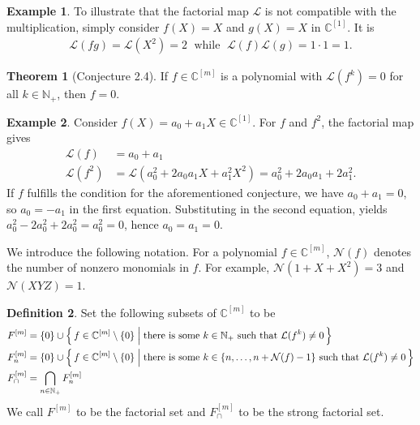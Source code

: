 \documentclass[a4paper]{article}
\theoremstyle{definition}
\newtheorem{definition}{Definition}[]
\newtheorem{example}{Example}[definition]
\newtheorem{theorem}[definition]{Theorem}
\newcommand{\makeset}[2]{\mleft\{\, #1 \; \middle| \; #2 \,\mright\}}
\begin{document}
%
\begin{example}
    To illustrate that the factorial map \(\mathcal{L}\) is not compatible with the multiplication, simply consider \(f(X) = X\) and \(g(X) = X\) in \(\mathbb{C}^{[1]}\). It is
    \begin{align*}
        \mathcal{L}(fg) = \mathcal{L}(X^2) = 2 \;\text{ while } \;\mathcal{L}(f) \mathcal{L}(g) = 1 \cdot 1 = 1 \text{.}
    \end{align*}
\end{example}
%
\begin{theorem}[Conjecture 2.4]
    If \(f \in \mathbb{C}^{[m]}\) is a polynomial with \(\mathcal{L}(f^k) = 0\) for all \(k \in \mathbb{N}_+\), then \(f = 0\).
\end{theorem}
%
\begin{example}
    Consider \(f(X) = a_0 + a_1X \in \mathbb{C}^{[1]}\). For \(f\) and \(f^2\), the factorial map gives
    \begin{align*}
        \mathcal{L}(f) &= a_0 + a_1 \\
        \mathcal{L}(f^2) &= \mathcal{L}(a_0^2 + 2a_0 a_1 X + a_1^2 X^2) = a_0^2 + 2 a_0 a_1 + 2 a_1^2 \text{.}
    \end{align*}    
    If \(f\) fulfills the condition for the aforementioned conjecture, we have \(a_0 + a_1 = 0\), so \(a_0 = -a_1\) in the first equation. Substituting in the second equation, yields \(a_0^2 - 2 a_0^2 + 2a_0^2 = a_0^2 = 0\), hence \(a_0 = a_1 = 0\).
\end{example}
%
We introduce the following notation. For a polynomial \(f \in \mathbb{C}^{[m]}\), \(\mathcal{N}(f)\) denotes the number of nonzero monomials in \(f\). For example, \(\mathcal{N}(1 + X + X^2) = 3\) and \(\mathcal{N}(XYZ) = 1\).
%
\begin{definition}
    Set the following subsets of \(\mathbb{C}^{[m]}\) to be
    \begin{align*}
        F^{[m]} &= \{0\} \cup \makeset{f \in \mathbb{C}^{[m]} \setminus \{0\}}{\text{there is some }k \in \mathbb{N}_+ \text{ such that }\mathcal{L}(f^k) \neq 0} \\
        F_n^{[m]} &= \{0\} \cup \makeset{f \in \mathbb{C}^{[m]} \setminus \{0\}}{\text{there is some }k \in \{n, \ldots, n + \mathcal{N}(f) - 1\} \text{ such that } \mathcal{L}(f^k) \neq 0} \\
        F_\cap^{[m]} &= \bigcap_{n \in \mathbb{N}_+} F_n^{[m]}
    \end{align*}
    We call \(F^{[m]}\) to be the factorial set and \(F^{[m]}_\cap\) to be the strong factorial set.
\end{definition}
\end{document}
